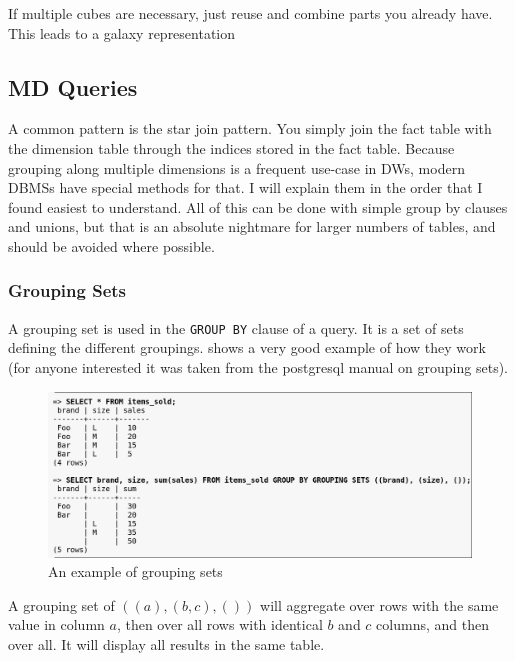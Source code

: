 \documentclass{article}
\begin{document}
\begin{keypointbox}
    If multiple cubes are necessary, just reuse and combine parts you already have.
    This leads to a galaxy representation
\end{keypointbox}

\subsection{MD Queries}
A common pattern is the star join pattern.
You simply join the fact table with the dimension table through the indices stored in the fact table.
Because grouping along multiple dimensions is a frequent use-case in DWs, modern DBMSs have special methods for that.
I will explain them in the order that I found easiest to understand.
All of this can be done with simple group by clauses and unions, but that is an absolute nightmare for larger numbers of tables, and should be avoided where possible.

\subsubsection{Grouping Sets}
A grouping set is used in the \lstinline{GROUP BY} clause of a query.
It is a set of sets defining the different groupings.
 shows a very good example of how they work (for anyone interested it was taken from the postgresql manual on grouping sets).

\begin{figure}[h]
    \centering
    \includegraphics[width=\textwidth]{groupingset.png}
    \caption{An example of grouping sets}
    \label{fig:groupingset}
\end{figure}

\begin{keypointbox}
    A grouping set of $((a),(b,c),())$ will aggregate over rows with the same value in column $a$, then over all rows with identical $b$ and $c$ columns, and then over all.
    It will display all results in the same table.
\end{keypointbox}
\end{document}
